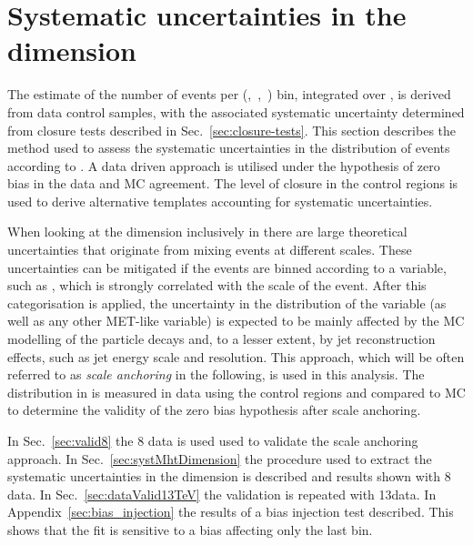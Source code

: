 \section{Systematic uncertainties in the \mht dimension}
\label{sec:syst-on-shape}

The estimate of the number of events per (\njet,~\nb,~\scalht) bin,
integrated over \mht, is derived from data control samples, with
the associated systematic uncertainty determined from closure tests
described in Sec.~\ref{sec:closure-tests}. This section
describes the method used to assess the systematic uncertainties in
the distribution of events according to \mht. A data driven approach is
utilised under the hypothesis of zero bias in the data and MC agreement.
The level of closure in the control regions is used
to derive alternative templates accounting for systematic uncertainties.

When looking at the \mht dimension inclusively in \scalht there are
large theoretical uncertainties that originate from mixing events
at different scales. These uncertainties can be mitigated if the events 
are binned according to a variable, such as \scalht, 
which is strongly correlated with the scale of the event. 
After this categorisation is applied, the uncertainty in 
the distribution of the \mht variable
(as well as any other MET-like variable) is expected to be 
mainly affected by the MC modelling of the particle 
decays and, to a lesser extent, by jet reconstruction effects, 
such as jet energy scale and resolution. 
This approach, which will be often referred to as \textit{scale anchoring}
in the following, is used in this analysis. The distribution in \mht
is measured in data using the control regions and compared to MC
to determine the validity of the zero bias hypothesis after scale anchoring.

In Sec.~\ref{sec:valid8} the 8 \TeV data is used used 
to validate the scale anchoring approach. 
In Sec.~\ref{sec:systMhtDimension} 
the procedure used to extract the systematic uncertainties in the 
\mht dimension is described and results shown with 8 \TeV data. 
In Sec.~\ref{sec:dataValid13TeV} the validation is repeated with 13\TeV data.
In Appendix~\ref{sec:bias_injection} the results of a bias injection test described. 
This shows that the fit is sensitive to a bias affecting only the last \mht bin.


